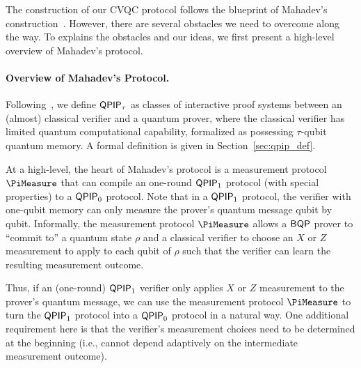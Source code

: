 % 


The construction of our CVQC protocol follows the blueprint of Mahadev's construction~\cite{FOCS:Mahadev18a}. However, there are several obstacles we need to overcome along the way. To explains the obstacles and our ideas, we first present a high-level overview of Mahadev's protocol.



\paragraph{Overview of Mahadev's Protocol.}
%
Following~\cite{FOCS:Mahadev18a}, we define $\operatorname{\mathsf{QPIP}}_{\tau}$ as classes of interactive proof systems between an (almost) classical verifier and a quantum prover, where the classical verifier has limited quantum computational capability, formalized as possessing $\tau$-qubit quantum memory. %
A formal definition is given in Section~\ref{sec:qpip_def}. 

At a high-level, the heart of Mahadev's protocol is a measurement protocol $\PiMeasure$ that can compile an one-round $\operatorname{\mathsf{QPIP}}_1$ protocol (with special properties) to a $\operatorname{\mathsf{QPIP}}_0$ protocol. Note that in a $\operatorname{\mathsf{QPIP}}_1$ protocol, the verifier with one-qubit memory can only measure the prover's quantum message qubit by qubit. Informally, the measurement protocol $\PiMeasure$ allows a $\operatorname{\mathsf{BQP}}$ prover to ``commit to'' a quantum state $\rho$ and a classical verifier to choose an $X$ or $Z$ measurement to apply to each qubit of $\rho$ such that the verifier can learn the resulting measurement outcome. 

Thus, if an (one-round) $\operatorname{\mathsf{QPIP}}_1$ verifier only applies $X$ or $Z$ measurement to the prover's quantum message, we can use the measurement protocol $\PiMeasure$ to turn the $\operatorname{\mathsf{QPIP}}_1$ protocol into a $\operatorname{\mathsf{QPIP}}_0$ protocol in a natural way. One additional requirement here is that the verifier's measurement choices need to be determined at the beginning (i.e., cannot depend adaptively on the intermediate measurement outcome). 

